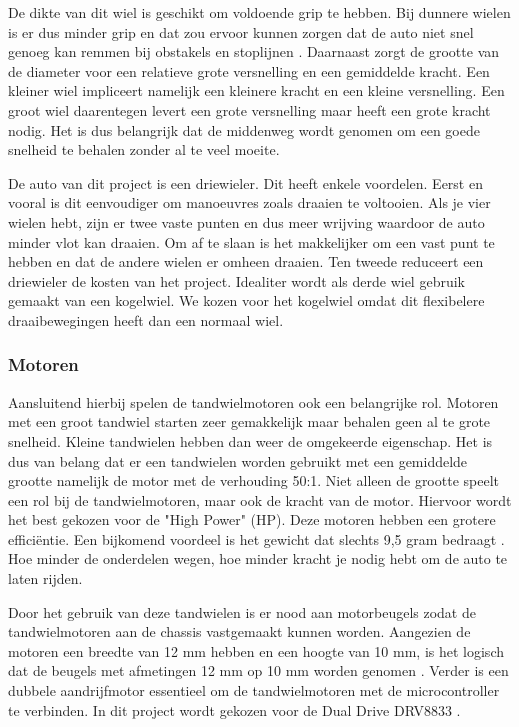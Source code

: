 \documentclass[a4paper,twoside,kulak]{kulakreport} %
\begin{document}
 De dikte van dit wiel is geschikt om voldoende grip te hebben. Bij dunnere wielen is er dus minder grip en dat zou ervoor kunnen zorgen dat de auto niet snel genoeg kan remmen bij obstakels en stoplijnen \cite{Banden}. 
 Daarnaast zorgt de grootte van de diameter voor een relatieve grote versnelling en een gemiddelde kracht. Een kleiner wiel impliceert namelijk een kleinere kracht en een kleine versnelling. Een groot wiel daarentegen levert een grote versnelling maar heeft een grote kracht nodig. Het is dus belangrijk dat de middenweg wordt genomen om een goede snelheid te behalen zonder al te veel moeite.  

De auto van dit project is een driewieler. Dit heeft enkele voordelen. Eerst en vooral is dit eenvoudiger om manoeuvres zoals draaien te voltooien. Als je vier wielen hebt, zijn er twee vaste punten en dus meer wrijving waardoor de auto minder vlot kan draaien. Om af te slaan is het makkelijker om een vast punt te hebben en dat de andere wielen er omheen draaien.%
Ten tweede reduceert een driewieler de kosten van het project. Idealiter wordt als derde wiel gebruik gemaakt van een kogelwiel. We kozen voor het kogelwiel omdat dit flexibelere draaibewegingen heeft dan een normaal wiel. 
\label{Wielen}
~

\subsubsection{Motoren}
Aansluitend hierbij spelen de tandwielmotoren ook een belangrijke rol. Motoren met een groot tandwiel starten zeer gemakkelijk maar behalen geen al te grote snelheid. Kleine tandwielen hebben dan weer de omgekeerde eigenschap. Het is dus van belang dat er een tandwielen worden gebruikt met een gemiddelde grootte namelijk de motor met de verhouding 50:1. Niet alleen de grootte speelt een rol bij de tandwielmotoren, maar ook de kracht van de motor. Hiervoor wordt het best gekozen voor de "High Power" (HP). Deze motoren hebben een grotere efficiëntie. Een bijkomend voordeel is het gewicht dat slechts 9,5 gram bedraagt \cite{MicroMetalGearMotor50:1HP}. %
Hoe minder de onderdelen wegen, hoe minder kracht je nodig hebt om de auto te laten rijden. 

Door het gebruik van deze tandwielen is er nood aan motorbeugels zodat de tandwielmotoren aan de chassis  vastgemaakt kunnen worden. Aangezien de motoren een breedte van 12 mm hebben en een hoogte van 10 mm, is het logisch dat de beugels met afmetingen 12 mm op 10 mm worden genomen \cite{MicroMetalGearMotorBeugel}.
Verder is een dubbele aandrijfmotor essentieel om de tandwielmotoren met de microcontroller te verbinden. In dit project wordt gekozen voor de Dual Drive DRV8833 \cite{DualDriveDRV8833}. 
\label{Motoren}
\end{document}
